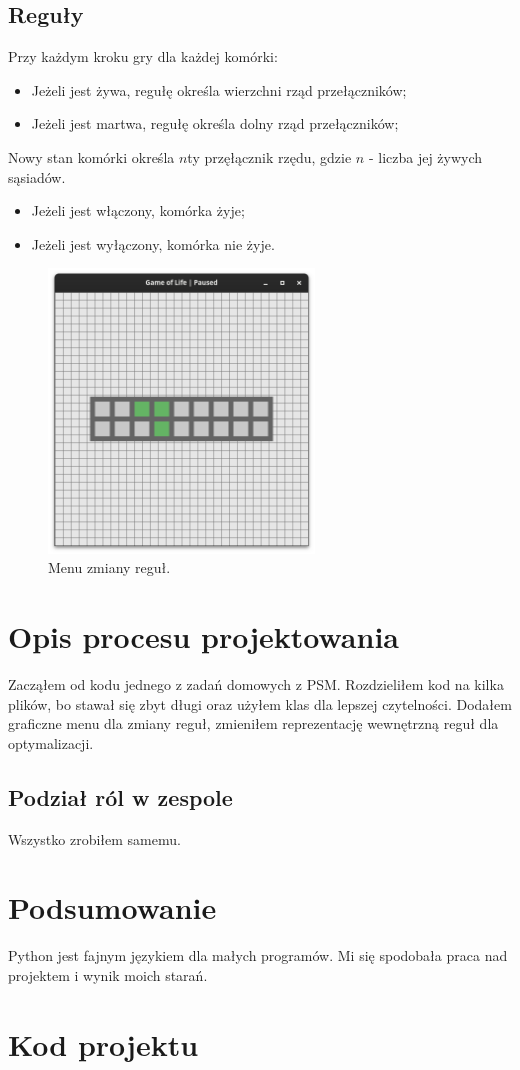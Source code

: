 \documentclass{article}
\begin{document}
\subsection{Reguły}

Przy każdym kroku gry dla każdej komórki:
\begin{itemize}
  \item Jeżeli jest żywa, regułę określa wierzchni rząd przełączników;
  \item Jeżeli jest martwa, regułę określa dolny rząd przełączników;
\end{itemize}
Nowy stan komórki określa $n$ty przęłącznik rzędu, gdzie $n$ - liczba jej żywych sąsiadów.
\begin{itemize}
  \item Jeżeli jest włączony, komórka żyje;
  \item Jeżeli jest wyłączony, komórka nie żyje.
\end{itemize}

\begin{figure}[h]
\centering
\includegraphics[width=200pt]{screenshots/rules.png}
\caption{Menu zmiany reguł.}
\end{figure}

\section{Opis procesu projektowania}
Zacząłem od kodu jednego z zadań domowych z PSM. Rozdzieliłem kod na kilka plików,
bo stawał się zbyt długi oraz użyłem klas dla lepszej czytelności. Dodałem graficzne menu
dla zmiany reguł, zmieniłem reprezentację wewnętrzną reguł dla optymalizacji.

\subsection{Podział ról w zespole}
Wszystko zrobiłem samemu.

\section{Podsumowanie}
Python jest fajnym językiem dla małych programów. Mi się spodobała praca nad projektem
i wynik moich starań.

\pagebreak

\section{Kod projektu}




\end{document}
